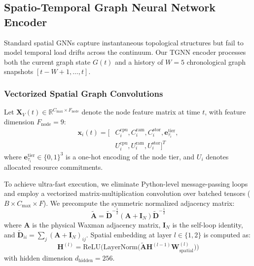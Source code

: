 \documentclass[conference]{IEEEtran}
\begin{document}
\subsection{Spatio-Temporal Graph Neural Network Encoder}
Standard spatial GNNs capture instantaneous topological structures but fail to model temporal load drifts across the continuum. Our TGNN encoder processes both the current graph state $G(t)$ and a history of $W=5$ chronological graph snapshots $[t-W+1, \dots, t]$.

\subsubsection{Vectorized Spatial Graph Convolutions}
Let $\mathbf{X}_V(t) \in \mathbb{R}^{C_{\max} \times F_{\text{node}}}$ denote the node feature matrix at time $t$, with feature dimension $F_{\text{node}} = 9$:
\begin{align}
\mathbf{x}_{i}(t) = \big[ & C_i^{\text{cpu}}, C_i^{\text{ram}}, C_i^{\text{stor}}, \mathbf{e}_{\tau_i}^{\text{tier}}, \nonumber \\
& U_i^{\text{cpu}}, U_i^{\text{ram}}, U_i^{\text{stor}} \big]^T
\end{align}
where $\mathbf{e}_{\tau_i}^{\text{tier}} \in \{0, 1\}^3$ is a one-hot encoding of the node tier, and $U_i$ denotes allocated resource commitments.

To achieve ultra-fast execution, we eliminate Python-level message-passing loops and employ a vectorized matrix-multiplication convolution over batched tensors ($B \times C_{\max} \times F$). We precompute the symmetric normalized adjacency matrix:
\begin{equation}
\tilde{\mathbf{A}} = \tilde{\mathbf{D}}^{-\frac{1}{2}} (\mathbf{A} + \mathbf{I}_N) \tilde{\mathbf{D}}^{-\frac{1}{2}}
\end{equation}
where $\mathbf{A}$ is the physical Waxman adjacency matrix, $\mathbf{I}_N$ is the self-loop identity, and $\tilde{\mathbf{D}}_{ii} = \sum_j (\mathbf{A} + \mathbf{I}_N)_{ij}$. Spatial embedding at layer $l \in \{1, 2\}$ is computed as:
\begin{equation}
\mathbf{H}^{(l)} = \text{ReLU}\Big(\text{LayerNorm}\big(\tilde{\mathbf{A}} \mathbf{H}^{(l-1)} \mathbf{W}_{\text{spatial}}^{(l)}\big)\Big)
\end{equation}
with hidden dimension $d_{\text{hidden}} = 256$.
\end{document}
